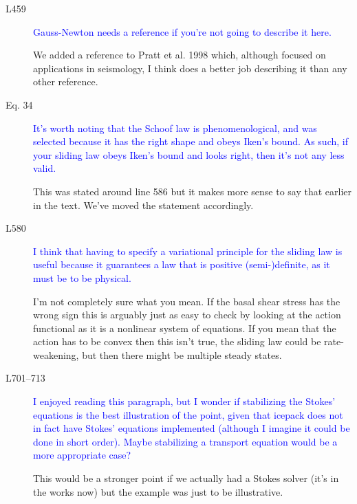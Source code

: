 \documentclass{article}
\theoremstyle{definition}
\theoremstyle{plain}
\begin{document}
\begin{description}
\item[L459] \textcolor{blue}{Gauss-Newton needs a reference if you’re not going to describe it here.}

We added a reference to Pratt et al. 1998 which, although focused on applications in seismology, I think does a better job describing it than any other reference.

\item[Eq. 34] \textcolor{blue}{It’s worth noting that the Schoof law is phenomenological, and was
selected because it has the right shape and obeys Iken’s bound. As such,
if your sliding law obeys Iken’s bound and looks right, then it’s not any
less valid.}

This was stated around line 586 but it makes more sense to say that earlier in the text.
We've moved the statement accordingly.

\item[L580] \textcolor{blue}{I think that having to specify a variational principle for the sliding law
is useful because it guarantees a law that is positive (semi-)definite, as it
must be to be physical.}

I'm not completely sure what you mean.
If the basal shear stress has the wrong sign this is arguably just as easy to check by looking at the action functional as it is a nonlinear system of equations.
If you mean that the action has to be convex then this isn't true, the sliding law could be rate-weakening, but then there might be multiple steady states.

\item[L701–713] \textcolor{blue}{I enjoyed reading this paragraph, but I wonder if stabilizing the
Stokes’ equations is the best illustration of the point, given that icepack
does not in fact have Stokes’ equations implemented (although I imagine
it could be done in short order). Maybe stabilizing a transport equation
would be a more appropriate case?}

This would be a stronger point if we actually had a Stokes solver (it's in the works now) but the example was just to be illustrative.
\end{description}
\end{document}
